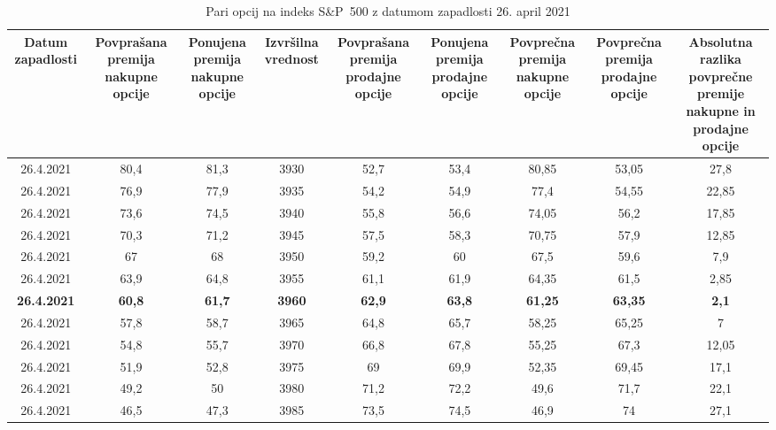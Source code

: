 \documentclass[12pt,a4paper, reqno]{amsart}
\theoremstyle{definition} %
\theoremstyle{plain} %
\begin{document}
\begin{table}[h!]
 \tiny
  \caption{Pari opcij na indeks S\&P~500 z datumom zapadlosti 26. april 2021}
  \label{table:Tabela 1}
  \begin{adjustbox}{center}
    \begin{tabular}{|c|c|c|c|c|c|c|c|c|}
    \hline
    \multicolumn{1}{|p{5.1em}|}{\textbf{Datum zapadlosti}} & \multicolumn{1}{p{5.7em}|}{\textbf{Povprašana premija nakupne opcije}} & \multicolumn{1}{p{5em}|}{\textbf{Ponujena premija nakupne opcije}} & \multicolumn{1}{p{4.4em}|}{\textbf{Izvršilna vrednost}} & \multicolumn{1}{p{5.8em}|}{\textbf{Povprašana premija prodajne opcije}} & \multicolumn{1}{p{4.7em}|}{\textbf{Ponujena premija prodajne opcije}} & \multicolumn{1}{p{5.2em}|}{\textbf{Povprečna premija nakupne opcije}} & \multicolumn{1}{p{5.2em}|}{\textbf{Povprečna premija prodajne opcije}} & \multicolumn{1}{p{11em}|}{\textbf{Absolutna razlika povprečne premije nakupne in prodajne opcije}} \\
    \hline
    26.4.2021 & 80,4 & 81,3 & 3930 & 52,7 & 53,4 & 80,85 & 53,05 & 27,8 \\
    \hline
    26.4.2021 & 76,9 & 77,9 & 3935 & 54,2 & 54,9 & 77,4 & 54,55 & 22,85 \\
    \hline
    26.4.2021 & 73,6 & 74,5 & 3940 & 55,8 & 56,6 & 74,05 & 56,2 & 17,85 \\
    \hline
    26.4.2021 & 70,3 & 71,2 & 3945 & 57,5 & 58,3 & 70,75 & 57,9 & 12,85\\
    \hline
    26.4.2021 & 67 & 68 & 3950 & 59,2 & 60 & 67,5 & 59,6 & 7,9\\
    \hline
    26.4.2021 & 63,9 & 64,8 & 3955 & 61,1 & 61,9 & 64,35 & 61,5 & 2,85 \\
    \hline
    \textbf{26.4.2021} & \textbf{60,8} & \textbf{61,7} & \textbf{3960} & \textbf{62,9} & \textbf{63,8} & \textbf{61,25} & \textbf{63,35} & \textbf{2,1} \\
    \hline
    26.4.2021 & 57,8 & 58,7 & 3965 & 64,8 & 65,7 & 58,25 & 65,25 & 7 \\
    \hline
    26.4.2021 & 54,8 & 55,7 & 3970 & 66,8 & 67,8 & 55,25 & 67,3 & 12,05 \\
    \hline
    26.4.2021 & 51,9 & 52,8 & 3975 & 69 & 69,9 & 52,35 & 69,45 & 17,1 \\
    \hline
    26.4.2021 & 49,2 & 50 & 3980 & 71,2 & 72,2 & 49,6 & 71,7 & 22,1 \\
    \hline
    26.4.2021 & 46,5 & 47,3 & 3985 & 73,5 & 74,5 & 46,9 & 74 & 27,1 \\
    \hline
    \end{tabular}
   \end{adjustbox}{}
\end{table}
\end{document}
